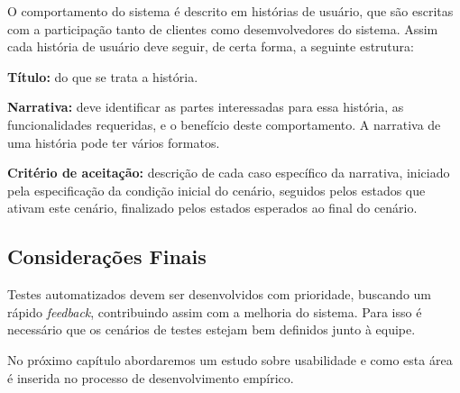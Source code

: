 O comportamento do sistema é descrito em histórias de usuário, que são 
escritas com a participação tanto de clientes como desemvolvedores do sistema. Assim 
cada história de usuário deve seguir, de certa forma, a seguinte estrutura:

\textbf{Título:} do que se trata a história.

\textbf{Narrativa:} deve identificar as partes interessadas para essa história, as 
funcionalidades requeridas, e o benefício deste comportamento. A narrativa de uma 
história pode ter vários formatos.

\textbf{Critério de aceitação:} descrição de cada caso específico da narrativa, 
iniciado pela especificação da condição inicial do cenário, seguidos pelos estados 
que ativam este cenário, finalizado pelos estados esperados ao final do cenário.


\subsection{Considerações Finais}

Testes automatizados devem ser desenvolvidos com prioridade, buscando um rápido 
\textit{feedback}, contribuindo assim com a melhoria do sistema. Para isso é 
necessário que os cenários de testes estejam bem definidos junto à equipe.

No próximo capítulo abordaremos um estudo sobre usabilidade e como esta área é inserida no processo de desenvolvimento empírico.

